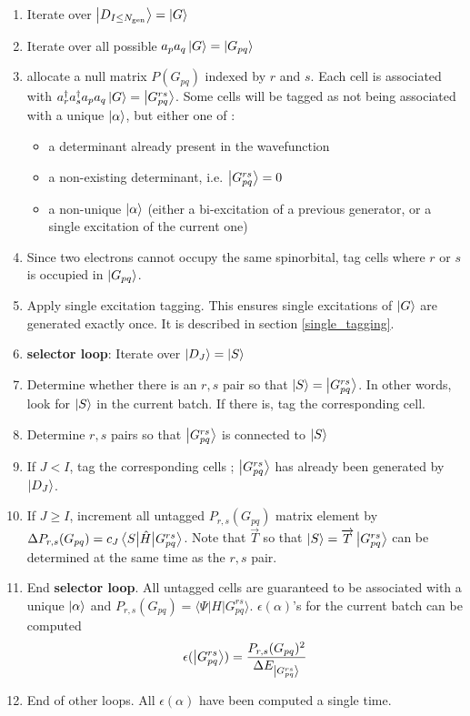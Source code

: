 \documentclass[./thesis.tex]{subfiles}
\newcommand{\Gpqrs}{\ket{G^{rs}_{pq}}}
\begin{document}
\begin{enumerate}
\item
Iterate over $\ket {D_{I \leq {N_\text{gen}}}} = \ket G$
\item
Iterate over all possible $a_p a_q \ket G = \ket {G_{pq}}$
\item
allocate a null matrix $P(G_{pq})$ indexed by $r$ and $s$. Each cell is associated with $a^\dagger_r a^\dagger_s a_p a_q  \ket G = \Gpqrs$. Some cells will be tagged as not being associated with a unique $\ket \alpha$, but either one of :
\begin{itemize}
\item
a determinant already present in the wavefunction
\item
a non-existing determinant, i.e. $\Gpqrs = 0$
\item
a non-unique $\ket \alpha$ (either a bi-excitation of a previous generator, or a single excitation of the current one)
\end{itemize}

\item
Since two electrons cannot occupy the same spinorbital, tag cells where $r$ or $s$ is occupied in $\ket {G_{pq}}$.
\item
Apply single excitation tagging. This ensures single excitations of $\ket G$ are generated exactly once. It is described in section \ref{single_tagging}.
\item
\textbf{selector loop}: Iterate over $\ket {D_J} = \ket S$ 
\item
Determine whether there is an $r,s$ pair so that $\ket S = \ket {G_{pq}^{rs}}$. In other words, look for $\ket S$ in the current batch. If there is, tag the corresponding cell.
\item
Determine $r,s$ pairs so that $\ket {G_{pq}^{rs}}$ is connected to $\ket S$
\item
If $J<I$, tag the corresponding cells ; $\ket {G_{pq}^{rs}}$ has already been generated by $\ket {D_J}$.
\item
If $J \geq I$, increment all untagged $P_{r,s}(G_{pq})$ matrix element by $\Delta P_{r,s}(G_{pq}) = c_J \mel{S}{\hat{H}}{G^{rs}_{pq}}$. Note that $\overrightarrow{T}$ so that $\ket S=\overrightarrow{T} \Gpqrs$ can be determined at the same time as the $r,s$ pair.
\item
End \textbf{selector loop}. All untagged cells are guaranteed to be associated with a unique $\ket \alpha$ and $P_{r,s}(G_{pq}) = \langle \Psi |H|G^{rs}_{pq} \rangle$. $\epsilon(\alpha)$'s for the current batch can be computed  \\

\begin{equation}
\epsilon(\ket {G_{pq}^{rs}}) = \frac{P_{r,s}(G_{pq})^2}{\Delta E_{\Gpqrs}}
\end{equation}
\item
End of other loops. All $\epsilon(\alpha)$ have been computed a single time.

\end{enumerate}
\end{document}
